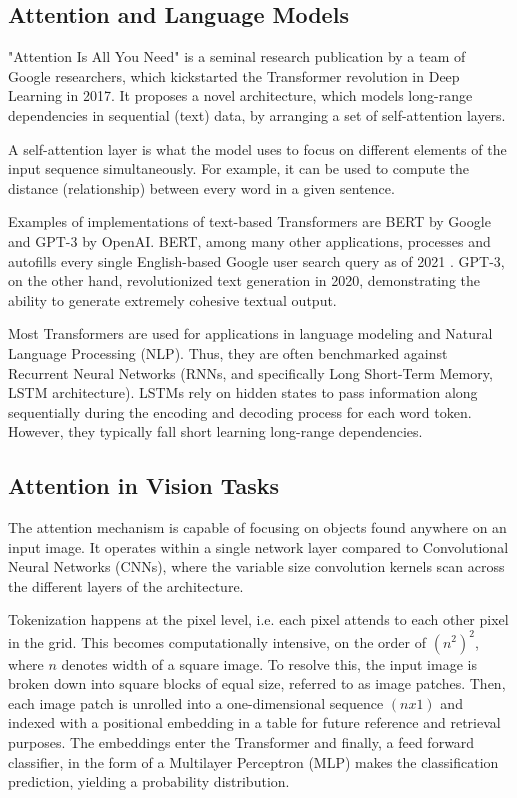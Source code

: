 \subsection{Attention and Language Models}

"Attention Is All You Need" is a seminal research publication
by a team of Google researchers, which kickstarted the Transformer revolution in Deep Learning in 2017.
It proposes a novel architecture, which models long-range dependencies in
sequential (text) data, by arranging a set of self-attention layers. 

A self-attention layer is what the model uses to focus on different elements of the 
input sequence simultaneously. For example, it can be used to compute the 
distance (relationship) between every word in a given sentence. \citep{Attention}


Examples of implementations of text-based Transformers are BERT by Google and GPT-3 by OpenAI.
BERT, among many other applications, processes and autofills every single English-based 
Google user search query as of 2021 . \citep{bert}
GPT-3, on the other hand, revolutionized text generation in 2020, demonstrating the ability 
to generate extremely cohesive textual output.

Most Transformers are used for applications in language modeling and Natural Language Processing (NLP).
Thus, they are often benchmarked against Recurrent Neural Networks (RNNs, and specifically 
Long Short-Term Memory, LSTM architecture). LSTMs rely on hidden states to pass information 
along sequentially during the encoding and decoding process for each word token. 
However, they typically fall short learning long-range dependencies.


\subsection{Attention in Vision Tasks}

The attention mechanism is capable of focusing on objects found anywhere on an input image.
It operates within a single network layer compared to Convolutional Neural Networks (CNNs),
where the variable size convolution kernels scan across the different layers of the architecture.
\citep{dosovitskiy2020vit}

Tokenization happens at the pixel level, i.e. each pixel attends to each other pixel in the grid. 
This becomes computationally intensive, on the order of $(n^2)^2$, where $n$ denotes width of a square image. 
To resolve this, the input image is broken down into square blocks of equal size, referred to as image patches.
Then, each image patch is unrolled into a one-dimensional sequence $(n x 1)$ and indexed with a positional 
embedding in a table for future reference and retrieval purposes. The embeddings enter the Transformer and 
finally, a feed forward classifier, in the form of a Multilayer Perceptron (MLP) 
makes the classification prediction, yielding a probability distribution. \citep{dosovitskiy2020vit}


